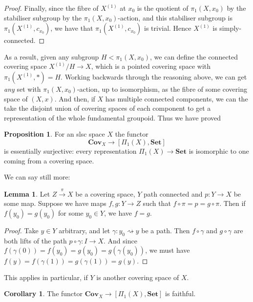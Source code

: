 \documentclass{tufte-handout}
\def\Set {\mathbf{Set}}
\def\Cov {\mathbf{Cov}}
\newcommand{\lecturenum}[1]{\marginnote{\color{red}Lecture #1}}
\theoremstyle{definition}
\newtheorem{prop}{Proposition}
\newtheorem{lemma}{Lemma}
\newtheorem{corollary}{Corollary}
\begin{document}
\begin{proof}
Finally, since the fibre of $X^{(1)}$ at $x_0$ is the quotient of $\pi_1(X,x_0)$ by the stabiliser subgroup by the $\pi_1(X,x_0)$-action, and this stabiliser subgroup is $\pi_1(X^{(1)},c_{x_0})$, we have that $\pi_1(X^{(1)},c_{x_0})$ is trivial. Hence $X^{(1)}$ is simply-connected.
\end{proof}

As a result, given any subgroup $H < \pi_1(X,x_0)$, we can define the connected covering space $X^{(1)}/H \to X$, which is a pointed covering space with $\pi_1(X^{(1)},\ast) = H$. Working backwards through the reasoning above, we can get \emph{any} set with $\pi_1(X,x_0)$-action, up to isomorphism, as the fibre of some covering space of $(X,x)$. And then, if $X$ has multiple connected components, we can the take the disjoint union of covering spaces of each component to get a representation of the whole fundamental groupoid. Thus we have proved

\begin{prop}
For an slsc space $X$ the functor
\[
	\Cov_X \to [\Pi_1(X),\Set]
\]
is essentially surjective: every representation $\Pi_1(X) \to \Set$ is isomorphic to one coming from a covering space.
\end{prop}

We\lecturenum{17} can say still more:

\begin{lemma}

Let $Z\xrightarrow{\pi} X$ be a covering space, $Y$ path connected and $p\colon Y\to X$ 
be some map. Suppose we have maps $f,g\colon Y\to Z$ such that $f\circ \pi = p = g\circ 
\pi$. Then if $f(y_0) = g(y_0)$ for some $y_0\in Y$, we have $f=g$.

\end{lemma}

\begin{proof}
Take $y\in Y$ arbitrary, and let $\gamma\colon y_0 \rightsquigarrow y$ be a path. Then $f\circ \gamma$ and $g\circ \gamma$ are both lifts of the path $p\circ \gamma\colon I \to X$. And since $f(\gamma(0)) = f(y_0) = g(y_0) = g(\gamma(y_0))$, we must have $f(y) = f(\gamma(1)) = g(\gamma(1)) = g(y)$. 
\end{proof}

This applies in particular, if $Y$ is another covering space of $X$.

\begin{corollary}
The functor $\Cov_{X} \to [\Pi_1(X),\Set]$ is faithful.
\end{corollary}
\end{document}
